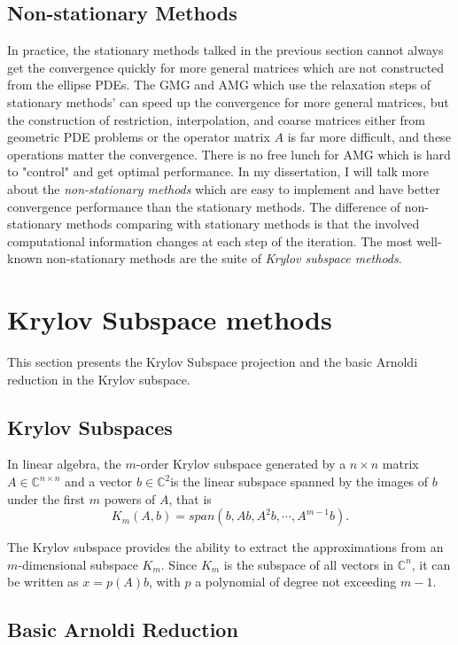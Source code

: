 \subsection{Non-stationary Methods}

In practice, the stationary methods talked in the previous section cannot always get the convergence quickly for more general matrices which are not constructed from the ellipse PDEs. The GMG and AMG which use the relaxation steps of stationary methods' can speed up the convergence for more general matrices, but the construction of restriction, interpolation, and coarse matrices either from geometric PDE problems or the operator matrix $A$ is far more difficult, and these operations matter the convergence. There is no free lunch for AMG which is hard to "control" and get optimal performance. In my dissertation, I will talk more about the \textit{non-stationary methods} which are easy to implement and have better convergence performance than the stationary methods. The difference of non-stationary methods comparing with stationary methods is that the involved computational information changes at each step of the iteration. The most well-known non-stationary methods are the suite of \textit{Krylov subspace methods}.

\section{Krylov Subspace methods}

This section presents the Krylov Subspace projection and the basic Arnoldi reduction in the Krylov subspace.

\subsection{Krylov Subspaces}

In linear algebra, the $m$-order Krylov subspace \cite{saad1981krylov} generated by a $n\times n$ matrix $A \in \mathbb{C}^{n \times n}$ and a vector $b \in \mathbb{C}^2$is the linear subspace spanned by the images of $b$ under the first $m$ powers of $A$, that is 
\[K_m(A,b)=span (b, Ab, A^2b,\cdots, A^{m-1}b).\] 

The Krylov subspace provides the ability to extract the approximations from an $m$-dimensional subspace $K_m$. Since $K_m$ is the subspace of all vectors in $\mathbb{C}^n$, it can be written as $x=p(A)b$, with $p$ a polynomial of degree not exceeding $m-1$.

\subsection{Basic Arnoldi Reduction}

